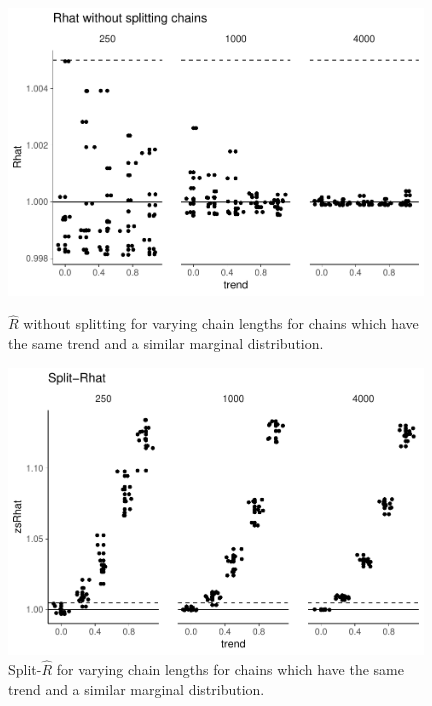 \documentclass[american,]{article}
\begin{document}
\begin{figure}[tp]
  \centering
  \begin{minipage}{0.48\textwidth}
  \includegraphics[width=0.98\textwidth]{graphics/rhat-same-trend-1.pdf}
  \caption{\(\widehat{R}\) without splitting for varying chain lengths
    for chains which have the same trend and a similar marginal
    distribution.}
  \label{fig:rhat-same-trend-1}
\end{minipage}
\hfill
  \begin{minipage}{0.48\textwidth}
  \includegraphics[width=0.98\textwidth]{graphics/zsrhat-same-trend-1.pdf}
  \caption{Split-\(\widehat{R}\) for varying chain lengths
    for chains which have the same trend and a similar marginal
    distribution.}
  \label{fig:zsrhat-same-trend-1}
\end{minipage}
\end{figure}
\end{document}
